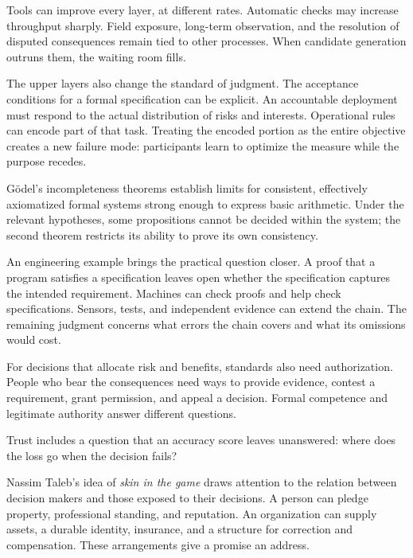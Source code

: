 

Tools can improve every layer, at different rates. Automatic checks may increase throughput sharply. Field exposure, long-term observation, and the resolution of disputed consequences remain tied to other processes. When candidate generation outruns them, the waiting room fills.

The upper layers also change the standard of judgment. The acceptance conditions for a formal specification can be explicit. An accountable deployment must respond to the actual distribution of risks and interests. Operational rules can encode part of that task. Treating the encoded portion as the entire objective creates a new failure mode: participants learn to optimize the measure while the purpose recedes.


Gödel's incompleteness theorems establish limits for consistent, effectively axiomatized formal systems strong enough to express basic arithmetic. Under the relevant hypotheses, some propositions cannot be decided within the system; the second theorem restricts its ability to prove its own consistency.\cite{godel1931}

An engineering example brings the practical question closer. A proof that a program satisfies a specification leaves open whether the specification captures the intended requirement. Machines can check proofs and help check specifications. Sensors, tests, and independent evidence can extend the chain. The remaining judgment concerns what errors the chain covers and what its omissions would cost.

For decisions that allocate risk and benefits, standards also need authorization. People who bear the consequences need ways to provide evidence, contest a requirement, grant permission, and appeal a decision. Formal competence and legitimate authority answer different questions.


Trust includes a question that an accuracy score leaves unanswered: where does the loss go when the decision fails?

Nassim Taleb's idea of \emph{skin in the game} draws attention to the relation between decision makers and those exposed to their decisions. A person can pledge property, professional standing, and reputation. An organization can supply assets, a durable identity, insurance, and a structure for correction and compensation. These arrangements give a promise an address.

